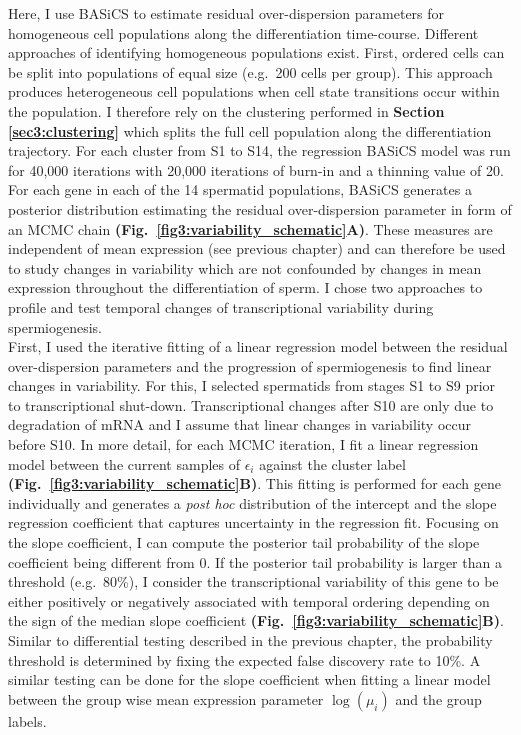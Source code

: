 Here, I use BASiCS to estimate residual over-dispersion parameters for homogeneous cell populations along the differentiation time-course. 
Different approaches of identifying homogeneous populations exist. First, ordered cells can be split into populations of equal size (e.g.~200 cells per group). 
This approach produces heterogeneous cell populations when cell state transitions occur within the population. 
I therefore rely on the clustering performed in \textbf{Section \ref{sec3:clustering}} which splits the full cell population along the differentiation trajectory. 
For each cluster from S1 to S14, the regression BASiCS model was run for 40,000 iterations with 20,000 iterations of burn-in and a thinning value of 20. \\

For each gene in each of the 14 spermatid populations, BASiCS generates a posterior distribution estimating the residual over-dispersion parameter in form of an MCMC chain \textbf{(Fig.~\ref{fig3:variability_schematic}A)}. 
These measures are independent of mean expression (see previous chapter) and can therefore be used to study changes in variability which are not confounded by changes in mean expression throughout the differentiation of sperm. 
I chose two approaches to profile and test temporal changes of transcriptional variability during spermiogenesis. \\

First, I used the iterative fitting of a linear regression model between the residual over-dispersion parameters and the progression of spermiogenesis to find linear changes in variability. 
For this, I selected spermatids from stages S1 to S9 prior to transcriptional shut-down. 
Transcriptional changes after S10 are only due to degradation of mRNA and I assume that linear changes in variability occur before S10. 
In more detail, for each MCMC iteration, I fit a linear regression model between the current samples of $\epsilon_i$ against the cluster label \textbf{(Fig.~\ref{fig3:variability_schematic}B)}. 
This fitting is performed for each gene individually and generates a \emph{post hoc} distribution of the intercept and the slope regression coefficient that captures uncertainty in the regression fit. 
Focusing on the slope coefficient, I can compute the posterior tail probability of the slope coefficient being different from 0. 
If the posterior tail probability is larger than a threshold (e.g.~80\%), I consider the transcriptional variability of this gene to be either positively or negatively associated with temporal ordering depending on the sign of the median slope coefficient \textbf{(Fig.~\ref{fig3:variability_schematic}B)}. 
Similar to differential testing described in the previous chapter, the probability threshold is determined by fixing the expected false discovery rate to 10\%. 
A similar testing can be done for the slope coefficient when fitting a linear model between the group wise mean expression parameter $\log(\mu_i)$ and the group labels.\\

